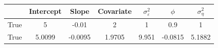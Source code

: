 \begin{tabular}{lcccccc}
\toprule
& Intercept & Slope & Covariate & $\sigma_\varepsilon^2$ & $\phi$ & $\sigma_\eta^2$ \\
\midrule
True & 5 & -0.01 & 2 & 1 & 0.9 & 1 \\
\midrule
True & 5.0099 & -0.0095 & 1.9705 & 9.951 & -0.0815 & 5.1882 \\
\bottomrule
\end{tabular}
